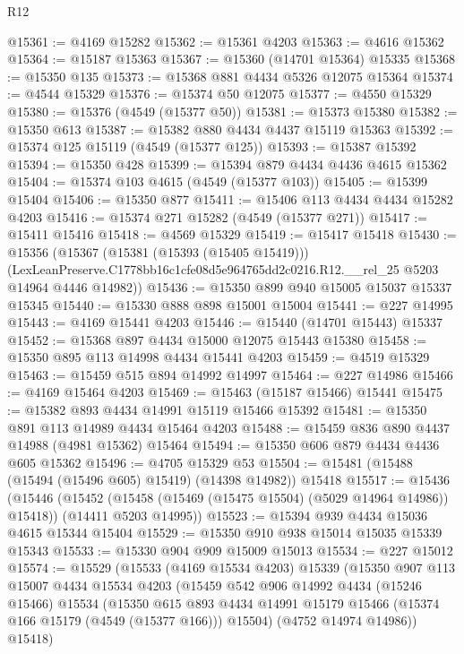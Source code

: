 \begin{lexlean}{R12}
\begin{coremodule}
@15361 := @4169 @15282
@15362 := @15361 @4203
@15363 := @4616 @15362
@15364 := @15187 @15363
@15367 := @15360 (@14701 @15364) @15335
@15368 := @15350 @135
@15373 := @15368 @881 @4434 @5326 @12075 @15364
@15374 := @4544 @15329
@15376 := @15374 @50 @12075
@15377 := @4550 @15329
@15380 := @15376 (@4549 (@15377 @50))
@15381 := @15373 @15380
@15382 := @15350 @613
@15387 := @15382 @880 @4434 @4437 @15119 @15363
@15392 := @15374 @125 @15119 (@4549 (@15377 @125))
@15393 := @15387 @15392
@15394 := @15350 @428
@15399 := @15394 @879 @4434 @4436 @4615 @15362
@15404 := @15374 @103 @4615 (@4549 (@15377 @103))
@15405 := @15399 @15404
@15406 := @15350 @877
@15411 := @15406 @113 @4434 @4434 @15282 @4203
@15416 := @15374 @271 @15282 (@4549 (@15377 @271))
@15417 := @15411 @15416
@15418 := @4569 @15329
@15419 := @15417 @15418
@15430 := @15356
    (@15367
      (@15381 (@15393 (@15405 @15419)))
      (LexLeanPreserve.C1778bb16c1cfe08d5e964765dd2c0216.R12.__rel_25 @5203 @14964 @4446 @14982))
@15436 := @15350 @899 @940 @15005 @15037 @15337 @15345
@15440 := @15330 @888 @898 @15001 @15004
@15441 := @227 @14995
@15443 := @4169 @15441 @4203
@15446 := @15440 (@14701 @15443) @15337
@15452 := @15368 @897 @4434 @15000 @12075 @15443 @15380
@15458 := @15350 @895 @113 @14998 @4434 @15441 @4203
@15459 := @4519 @15329
@15463 := @15459 @515 @894 @14992 @14997
@15464 := @227 @14986
@15466 := @4169 @15464 @4203
@15469 := @15463 (@15187 @15466) @15441
@15475 := @15382 @893 @4434 @14991 @15119 @15466 @15392
@15481 := @15350 @891 @113 @14989 @4434 @15464 @4203
@15488 := @15459 @836 @890 @4437 @14988 (@4981 @15362) @15464
@15494 := @15350 @606 @879 @4434 @4436 @605 @15362
@15496 := @4705 @15329 @53
@15504 := @15481 (@15488 (@15494 (@15496 @605) @15419) (@14398 @14982)) @15418
@15517 := @15436
    (@15446
      (@15452 (@15458 (@15469 (@15475 @15504) (@5029 @14964 @14986)) @15418))
      (@14411 @5203 @14995))
@15523 := @15394 @939 @4434 @15036 @4615 @15344 @15404
@15529 := @15350 @910 @938 @15014 @15035 @15339 @15343
@15533 := @15330 @904 @909 @15009 @15013
@15534 := @227 @15012
@15574 := @15529
    (@15533
      (@4169 @15534 @4203)
      @15339
      (@15350
        @907
        @113
        @15007
        @4434
        @15534
        @4203
        (@15459
          @542
          @906
          @14992
          @4434
          (@15246 @15466)
          @15534
          (@15350
            @615
            @893
            @4434
            @14991
            @15179
            @15466
            (@15374 @166 @15179 (@4549 (@15377 @166)))
            @15504)
          (@4752 @14974 @14986))
        @15418)

\end{coremodule}
\end{lexlean}
